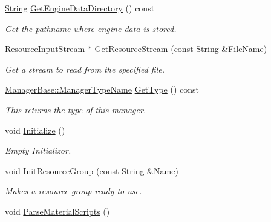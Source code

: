 \begin{DoxyCompactItemize}
\hyperlink{namespaceMezzanine_acf9fcc130e6ebf08e3d8491aebcf1c86}{String} \hyperlink{classMezzanine_1_1ResourceManager_a5b2bd318749c5d6e236680410c13f8bc}{GetEngineDataDirectory} () const 
\begin{DoxyCompactList}\small\item\em Get the pathname where engine data is stored. \item\end{DoxyCompactList}\item 
\hyperlink{classMezzanine_1_1ResourceInputStream}{ResourceInputStream} $\ast$ \hyperlink{classMezzanine_1_1ResourceManager_a5d6f86f351c9ea275436f31cc792b02b}{GetResourceStream} (const \hyperlink{namespaceMezzanine_acf9fcc130e6ebf08e3d8491aebcf1c86}{String} \&FileName)
\begin{DoxyCompactList}\small\item\em Get a stream to read from the specified file. \item\end{DoxyCompactList}\item 
\hyperlink{classMezzanine_1_1ManagerBase_a08cecf5169cad3e82be81a3a159b0b6e}{ManagerBase::ManagerTypeName} \hyperlink{classMezzanine_1_1ResourceManager_aafe55f1095a67f30e97bff25200685d7}{GetType} () const 
\begin{DoxyCompactList}\small\item\em This returns the type of this manager. \item\end{DoxyCompactList}\item 
void \hyperlink{classMezzanine_1_1ResourceManager_a4b4e77984e21e3eaa1c47772d2e9c6f4}{Initialize} ()
\begin{DoxyCompactList}\small\item\em Empty Initializor. \item\end{DoxyCompactList}\item 
void \hyperlink{classMezzanine_1_1ResourceManager_a836ed2ec024abe10433d8e4b18378c2c}{InitResourceGroup} (const \hyperlink{namespaceMezzanine_acf9fcc130e6ebf08e3d8491aebcf1c86}{String} \&Name)
\begin{DoxyCompactList}\small\item\em Makes a resource group ready to use. \item\end{DoxyCompactList}\item 
\hypertarget{classMezzanine_1_1ResourceManager_a78fc768b8bd9ec38ebebb06feb133fef}{
void \hyperlink{classMezzanine_1_1ResourceManager_a78fc768b8bd9ec38ebebb06feb133fef}{ParseMaterialScripts} ()}
\label{classMezzanine_1_1ResourceManager_a78fc768b8bd9ec38ebebb06feb133fef}


\end{DoxyCompactItemize}
